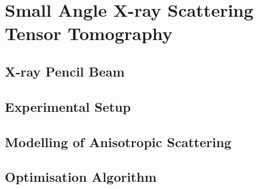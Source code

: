 \chapter{Small Angle X-ray Scattering Tensor Tomography}

\section{X-ray Pencil Beam}%

\section{Experimental Setup}

\section{Modelling of Anisotropic Scattering}

\section{Optimisation Algorithm}